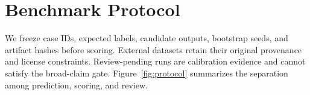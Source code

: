 \section{Benchmark Protocol}
We freeze case IDs, expected labels, candidate outputs, bootstrap seeds, and
artifact hashes before scoring. External datasets retain their original
provenance and license constraints. Review-pending runs are calibration
evidence and cannot satisfy the broad-claim gate. Figure~\ref{fig:protocol}
summarizes the separation among prediction, scoring, and review.


